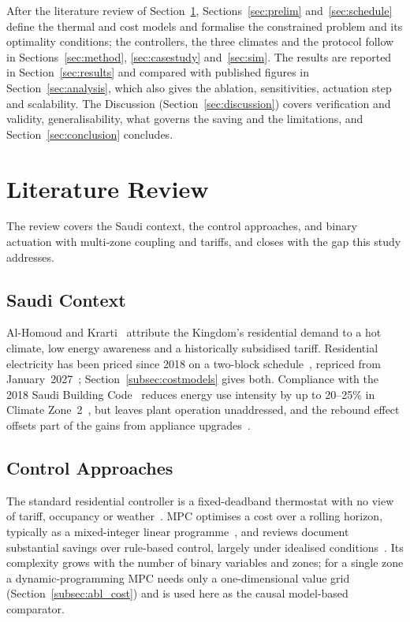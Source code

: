 \documentclass[3p,twocolumn,number]{elsarticle}
\begin{document}
After the literature review of Section~\ref{sec:litreview}, Sections~\ref{sec:prelim} and~\ref{sec:schedule} define the thermal and cost models and formalise the constrained problem and its optimality conditions; the controllers, the three climates and the protocol follow in Sections~\ref{sec:method}, \ref{sec:casestudy} and~\ref{sec:sim}. The results are reported in Section~\ref{sec:results} and compared with published figures in Section~\ref{sec:analysis}, which also gives the ablation, sensitivities, actuation step and scalability. The Discussion (Section~\ref{sec:discussion}) covers verification and validity, generalisability, what governs the saving and the limitations, and Section~\ref{sec:conclusion} concludes.
 
\section{Literature Review}
\label{sec:litreview}

The review covers the Saudi context, the control approaches, and binary actuation with multi-zone coupling and tariffs, and closes with the gap this study addresses.

\subsection{Saudi Context}

Al-Homoud and Krarti~\cite{AlHomoud2021} attribute the Kingdom's residential demand to a hot climate, low energy awareness and a historically subsidised tariff. Residential electricity has been priced since 2018 on a two-block schedule~\cite{SEC2024}, repriced from January~2027~\cite{SaudiEnergy2027}; Section~\ref{subsec:costmodels} gives both. Compliance with the 2018 Saudi Building Code~\cite{Alayed2021} reduces energy use intensity by up to 20--25\% in Climate Zone~2~\cite{Olawale2025}, but leaves plant operation unaddressed, and the rebound effect offsets part of the gains from appliance upgrades~\cite{Belaid2024}.

\subsection{Control Approaches}

The standard residential controller is a fixed-deadband thermostat with no view of tariff, occupancy or weather~\cite{Alotaibi2024}. MPC optimises a cost over a rolling horizon, typically as a mixed-integer linear programme~\cite{Risbeck2017,Dinh2022}, and reviews document substantial savings over rule-based control, largely under idealised conditions~\cite{Drgona2020}. Its complexity grows with the number of binary variables and zones; for a single zone a dynamic-programming MPC needs only a one-dimensional value grid (Section~\ref{subsec:abl_cost}) and is used here as the causal model-based comparator.
\end{document}
